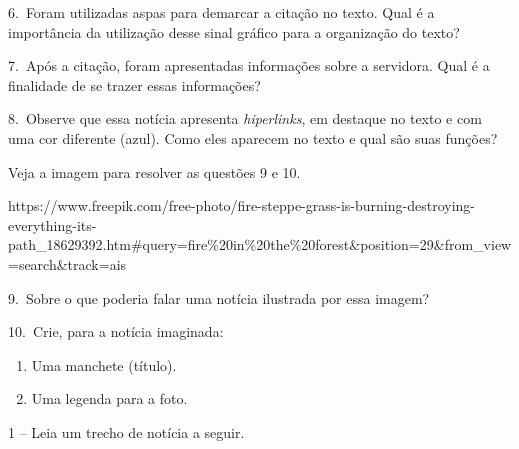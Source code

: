 \begin{itemize}
\begin{itemize}
{\begin{itemize}
6.~Foram utilizadas aspas para demarcar a citação no texto. Qual é a
importância da utilização desse sinal gráfico para a organização do
texto?



7.~Após a citação, foram apresentadas informações sobre a servidora.
Qual é a finalidade de se trazer essas informações?



8.~Observe que essa notícia apresenta \emph{hiperlinks}, em destaque no
texto e com uma cor diferente (azul). Como eles aparecem no texto e qual
são suas funções?



Veja a imagem para resolver as questões 9 e 10.

https://www.freepik.com/free-photo/fire-steppe-grass-is-burning-destroying-everything-its-path\_18629392.htm\#query=fire\%20in\%20the\%20forest\&position=29\&from\_view=search\&track=ais

9.~Sobre o que poderia falar uma notícia ilustrada por essa imagem?



10.~Crie, para a notícia imaginada:

\begin{enumerate}
\def\labelenumi{\arabic{enumi}.}
\tightlist
\item
  Uma manchete (título).
\item
  Uma legenda para a foto.
\end{enumerate}




1 -- Leia um trecho de notícia a seguir.


\end{itemize}}
\end{itemize}
\end{itemize}
